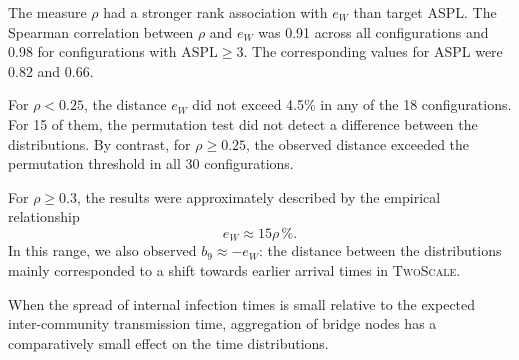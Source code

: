 \documentclass[a4paper,fleqn]{cas-sc}
\newcommand{\TS}{\textup{\textsc{TwoScale}}}
\newcommand{\eW}{e_{W}}
\begin{document}
The measure $\rho$ had a stronger rank association with $\eW$ than target ASPL. The Spearman correlation between $\rho$ and $\eW$ was 0.91 across all configurations and 0.98 for configurations with $\mathrm{ASPL}\geq3$. The corresponding values for ASPL were 0.82 and 0.66.

For $\rho<0.25$, the distance $\eW$ did not exceed 4.5\% in any of the 18 configurations. For 15 of them, the permutation test did not detect a difference between the distributions. By contrast, for $\rho\geq0.25$, the observed distance exceeded the permutation threshold in all 30 configurations.

For $\rho\geq0.3$, the results were approximately described by the empirical relationship
\begin{equation}
\eW \approx 15\rho\,\%.
\end{equation}
In this range, we also observed $b_9\approx-\eW$: the distance between the distributions mainly corresponded to a shift towards earlier arrival times in \TS{}.

When the spread of internal infection times is small relative to the expected inter-community transmission time, aggregation of bridge nodes has a comparatively small effect on the time distributions.
\end{document}
